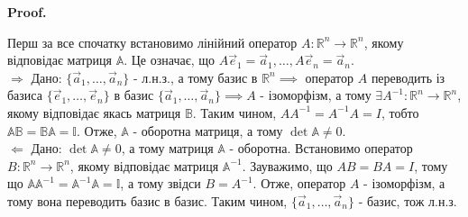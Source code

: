 \documentclass[a4paper, 10pt]{article}
\makeatletter
\def\rightproof{$\boxed{\Rightarrow}$ }
\def\leftproof{$\boxed{\Leftarrow}$ }
\theoremstyle{theoremdd}
\renewenvironment{proof}[1][Proof.\\]{\par
\pushQED{\hfill \qed}%
\normalfont \topsep6\p@\@plus6\p@\relax
\trivlist
\item\relax
{\bfseries
#1\@addpunct{.}}\hspace\labelsep\ignorespaces
}{%
\popQED\endtrivlist\@endpefalse
}
\makeatother
\begin{document}
\begin{proof}
Перш за все спочатку встановимо лінійний оператор $A \colon \mathbb{R}^n \to \mathbb{R}^n$, якому відповідає матриця $\mathbb{A}$. Це означає, що $A\vec{e}_1 = \vec{a}_1,\dots, A\vec{e}_n = \vec{a}_n$.
\bigskip \\
\rightproof Дано: $\{\vec{a}_1,\dots,\vec{a}_n \}$ - л.н.з., а тому базис в $\mathbb{R}^n \implies$ оператор $A$ переводить із базиса $\{\vec{e}_1,\dots,\vec{e}_n\}$ в базис $\{\vec{a}_1,\dots,\vec{a}_n\} \implies A$ - ізоморфізм, а тому $\exists A^{-1} \colon \mathbb{R}^n \to \mathbb{R}^n$, якому відповідає якась матриця $\mathbb{B}$. Таким чином, $AA^{-1} = A^{-1}A = I$, тобто $\mathbb{A} \mathbb{B} = \mathbb{B} \mathbb{A} = \mathbb{I}$. Отже, $\mathbb{A}$ - оборотна матриця, а тому $\det \mathbb{A} \neq 0$.
\bigskip \\
\leftproof Дано: $\det \mathbb{A} \neq 0$, а тому матриця $\mathbb{A}$ - оборотна. Встановимо оператор $B \colon \mathbb{R}^n \to \mathbb{R}^n$, якому відповідає матриця $\mathbb{A}^{-1}$. Зауважимо, що $AB = BA = I$, тому що $\mathbb{A} \mathbb{A}^{-1} = \mathbb{A}^{-1} \mathbb{A} = \mathbb{I}$, а тому звідси $B = A^{-1}$. Отже, оператор $A$ - ізоморфізм, а тому вона переводить базис в базис. Таким чином, $\{\vec{a}_1,\dots,\vec{a}_n \}$ - базис, тож л.н.з.
\end{proof}

\iffalse
\begin{proof}
$\{\vec{a}_1,\dots,\vec{a}_n\}$ - л.н.з. $\iff$ $\{\vec{a}_1,\dots,\vec{a}_n\}$ - базис в $\mathbb{R}^n \iff \mathbb{A} = (\vec{a}_1,\dots,\vec{a}_n)$ задає ізоморфізм \\ $A: \mathbb{R}^n \to \mathbb{R}^n$ із $\{\vec{e_1},\dots,\vec{e_n}\}$ в $\{\vec{a_1},\dots,\vec{a_n} \}$ $\iff$ має обернений $A^{-1} \iff \det \mathbb{A} \neq 0$.
\end{proof}
\fi
\end{document}
